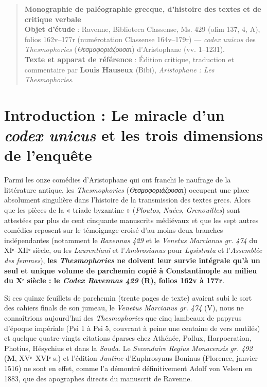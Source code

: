 \documentclass[11pt, a4paper, twoside]{article}
\renewcommand{\_}{\origunderscore\penalty0\relax}
\renewcommand{\texttt}[1]{#1}
\newcommand{\R}{\textbf{R}}
\newcommand{\M}{\textbf{M}}
\newcommand{\Bibi}{\textit{Bibi}}
\newcommand{\PsiUn}{\textgreek{Ψ}\textsuperscript{1}}
\newcommand{\PsiCinq}{\textgreek{Ψ}\textsuperscript{5}}
\def\R{R}%
\def\Bibi{Bibi}%
\def\PsiUn{Psi 1}%
\def\PsiCinq{Psi 5}%
\begin{document}
\begin{quote}
\textbf{Monographie de paléographie grecque, d'histoire des textes et de critique verbale}\\
\textbf{Objet d'étude} : Ravenne, Biblioteca Classense, Ms. 429 (olim 137, 4, A), folios \texttt{162v}–\texttt{177r} (numérotation Classense \texttt{164v}–\texttt{179r}) — \textit{codex unicus} des \textit{Thesmophories} (\textit{Θεσμοφοριάζουσαι}) d'Aristophane (\texttt{vv. 1–1231}).\\
\textbf{Texte et apparat de référence} : Édition critique, traduction et commentaire par \textbf{Louis Hauseux} (\Bibi{}), \textit{Aristophane : Les Thesmophories}.\\
\end{quote}



\section{Introduction : Le miracle d'un \textit{codex unicus} et les trois dimensions de l'enquête}

Parmi les onze comédies d'Aristophane qui ont franchi le naufrage de la littérature antique, les \textit{Thesmophories} (\textit{Θεσμοφοριάζουσαι}) occupent une place absolument singulière dans l'histoire de la transmission des textes grecs. Alors que les pièces de la « triade byzantine » (\textit{Ploutos}, \textit{Nuées}, \textit{Grenouilles}) sont attestées par plus de cent cinquante manuscrits médiévaux et que les sept autres comédies reposent sur le témoignage croisé d'au moins deux branches indépendantes (notamment le \textit{Ravennas 429} et le \textit{Venetus Marcianus gr. 474} du XIᵉ–XIIᵉ siècle, ou les \textit{Laurentiani} et l'\textit{Ambrosianus} pour \textit{Lysistrata} et l'\textit{Assemblée des femmes}), \textbf{les \textit{Thesmophories} ne doivent leur survie intégrale qu'à un seul et unique volume de parchemin copié à Constantinople au milieu du Xᵉ siècle : le \textit{Codex Ravennas 429} (\R{}), folios \texttt{162v} à \texttt{177r}}.

Si ces quinze feuillets de parchemin (trente pages de texte) avaient subi le sort des cahiers finals de son jumeau, le \textit{Venetus Marcianus gr. 474} (\texttt{V}), nous ne connaîtrions aujourd'hui des \textit{Thesmophories} que cinq lambeaux de papyrus d'époque impériale (\PsiUn{} à \PsiCinq{}, couvrant à peine une centaine de vers mutilés) et quelque quatre-vingts citations éparses chez Athénée, Pollux, Harpocration, Photius, Hésychius et dans la \textit{Souda}. Le \textit{Secondaire Regius Monacensis gr. 492} (\M{}, XVᵉ–XVIᵉ s.) et l'édition \textit{Juntine} d'Euphrosynus Boninus (Florence, janvier 1516) ne sont en effet, comme l'a démontré définitivement Adolf von Velsen en 1883, que des apographes directs du manuscrit de Ravenne.
\end{document}
